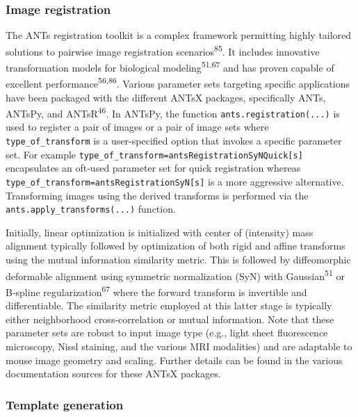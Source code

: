 \documentclass[
  12pt,
]{article}
\begin{document}
\subsubsection{Image registration}\label{image-registration}

The ANTs registration toolkit is a complex framework permitting highly
tailored solutions to pairwise image registration
scenarios\textsuperscript{85}. It includes innovative transformation
models for biological modeling\textsuperscript{51,67} and has proven
capable of excellent performance\textsuperscript{56,86}. Various
parameter sets targeting specific applications have been packaged with
the different ANTsX packages, specifically ANTs, ANTsPy, and
ANTsR\textsuperscript{46}. In ANTsPy, the function
\texttt{ants.registration(...)} is used to register a pair of images or
a pair of image sets where \texttt{type\_of\_transform} is a
user-specified option that invokes a specific parameter set. For example
\texttt{type\_of\_transform=\textquotesingle{}antsRegistrationSyNQuick{[}s{]}\textquotesingle{}}
encapsulates an oft-used parameter set for quick registration whereas
\texttt{type\_of\_transform=\textquotesingle{}antsRegistrationSyN{[}s{]}\textquotesingle{}}
is a more aggressive alternative. Transforming images using the derived
transforms is performed via the \texttt{ants.apply\_transforms(...)}
function.

Initially, linear optimization is initialized with center of (intensity)
mass alignment typically followed by optimization of both rigid and
affine transforms using the mutual information similarity metric. This
is followed by diffeomorphic deformable alignment using symmetric
normalization (SyN) with Gaussian\textsuperscript{51} or B-spline
regularization\textsuperscript{67} where the forward transform is
invertible and differentiable. The similarity metric employed at this
latter stage is typically either neighborhood cross-correlation or
mutual information. Note that these parameter sets are robust to input
image type (e.g., light sheet fluorescence microscopy, Nissl staining,
and the various MRI modalities) and are adaptable to mouse image
geometry and scaling. Further details can be found in the various
documentation sources for these ANTsX packages.

\subsubsection{Template generation}\label{template-generation}
\end{document}

